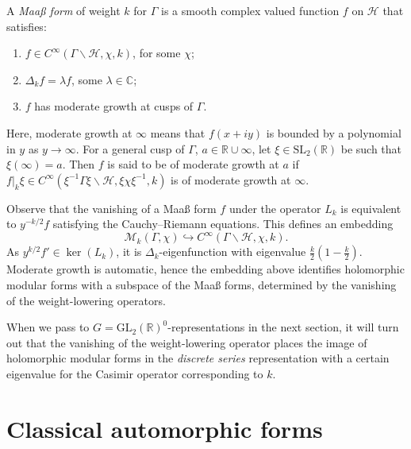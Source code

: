 \begin{definition}
\label{definition-Maass-form}
	A \textit{Maa{\ss} form} of weight $k$ for $\Gamma$ is a smooth complex valued function $f$ on $\mathcal{H}$ that satisfies:
	\begin{enumerate}
		\item $f \in C^{\infty}(\Gamma \backslash \mathcal{H}, \chi, k)$, for some $\chi$;
		\item $\Delta_k f = \lambda f$, some $\lambda \in \mathbb{C}$;
		\item $f$ has moderate growth at cusps of $\Gamma$.
	\end{enumerate}
Here, moderate growth at $\infty$ means that $f(x+iy)$ is bounded by a polynomial in $y$ as $y \to \infty$. For a general cusp of $\Gamma$, $a \in \mathbb{R} \cup \infty$, let $\xi \in \text{SL}_{2}(\mathbb{R})$ be such that $\xi(\infty) = a$. Then $f$ is said to be of moderate growth at $a$ if $f|_{k} \xi \in C^{\infty}(\xi^{-1} \Gamma \xi \backslash \mathcal{H}, \xi \chi \xi ^{-1}, k)$ is of moderate growth at $\infty$.
\end{definition}



\begin{remark}
\label{remark-modular-forms-to-maass-forms}
	Observe that the vanishing of a Maa{\ss} form $f$ under the operator $L_k$ is equivalent to $y^{-k/2} f$ satisfying the Cauchy--Riemann equations. This defines an embedding
\begin{equation}
 \label{equation-holomorphic-to-Maass}
 \mathcal{M}_k(\Gamma, \chi) \hookrightarrow C^{\infty}(\Gamma \backslash \mathcal{H}, \chi, k). 
\end{equation}
As $y^{k/2}f' \in \ker(L_k)$, it is $\Delta_k$-eigenfunction with eigenvalue $ \frac{k}{2}(1 - \frac{k}{2})$. Moderate growth is automatic, hence the embedding above identifies holomorphic modular forms with a subspace of the Maa{\ss} forms, determined by the vanishing of the weight-lowering operators. 

When we pass to $G = \text{GL}_2(\mathbb R)^0$-representations in the next section, it will turn out that the vanishing of the weight-lowering operator places the image of holomorphic modular forms in the \emph{discrete series} representation with a certain eigenvalue for the Casimir operator corresponding to $k$.
\end{remark}

\section{Classical automorphic forms}
\label{section-classical-automorphic-forms}

